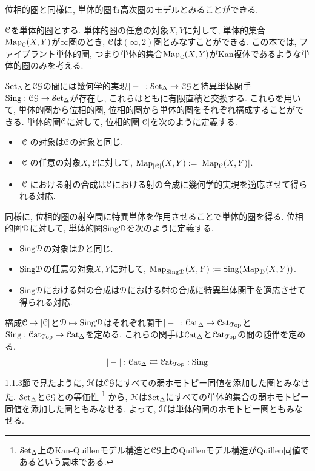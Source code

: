 \documentclass[uplatex, a4paper, 14Q, dvipdfmx]{jsreport}
\begin{document}
位相的圏と同様に, 単体的圏も高次圏のモデルとみることができる. 

\begin{remark} \label{rem.1.1.4.3}
  $\C$を単体的圏とする. 
  単体的圏の任意の対象$X,Y$に対して, 単体的集合$\Map_\C(X,Y)$が$\infty$圏のとき, $\C$は$(\infty,2)$圏とみなすことができる. 
  この本では, ファイブラント単体的圏, つまり単体的集合$\Map_\C(X,Y)$がKan複体であるような単体的圏のみを考える. 
\end{remark}

$\sSet$と$\CGWH$の間には幾何学的実現$|-| : \sSet \to \CGWH$と特異単体関手$\Sing : \CGWH \to \sSet$が存在し, これらはともに有限直積と交換する. 
これらを用いて, 単体的圏から位相的圏, 位相的圏から単体的圏をそれぞれ構成することができる. 
単体的圏$\C$に対して, 位相的圏$|\C|$を次のように定義する. 
\begin{itemize}
  \item $|\C|$の対象は$\C$の対象と同じ.
  \item $|\C|$の任意の対象$X,Y$に対して, $\Map_{|\C|}(X,Y) := |\Map_\C(X,Y)|$.
  \item $|\C|$における射の合成は$\C$における射の合成に幾何学的実現を適応させて得られる対応.
\end{itemize}

同様に, 位相的圏の射空間に特異単体を作用させることで単体的圏を得る. 
位相的圏$\D$に対して, 単体的圏$\Sing\D$を次のように定義する. 
\begin{itemize}
  \item $\Sing\D$の対象は$\D$と同じ.
  \item $\Sing\D$の任意の対象$X,Y$に対して, $\Map_{\Sing\D}(X,Y) := \Sing(\Map_\D(X,Y))$.
  \item $\Sing\D$における射の合成は$\D$における射の合成に特異単体関手を適応させて得られる対応.
\end{itemize}

構成$\C \mapsto |\C|$と$\D \mapsto \Sing\D$はそれぞれ関手$|-| : \Cat_\Delta \to \CatTop$と$\Sing : \CatTop \to \Cat_\Delta$を定める. 
これらの関手は$\Cat_\Delta$と$\CatTop$の間の随伴を定める. 
\begin{align*}
  |-| : \Cat_\Delta \rightleftarrows \CatTop : \Sing
\end{align*}

1.1.3節で見たように, $\H$は$\CGWH$にすべての弱ホモトピー同値を添加した圏とみなせた.
$\sSet$と$\CGWH$との等価性
\footnote{
  $\sSet$上のKan-Quillenモデル構造と$\CGWH$上のQuillenモデル構造がQuillen同値であるという意味である. 
}
から, $\H$は$\sSet$にすべての単体的集合の弱ホモトピー同値を添加した圏ともみなせる. 
よって, $\H$は単体的圏のホモトピー圏ともみなせる. 
\end{document}
